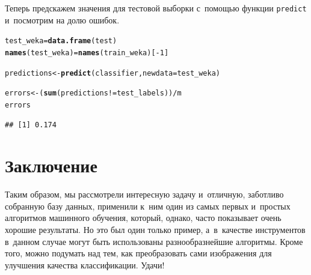 \documentclass[final,pdftex]{../../template/epsilonj}\usepackage[]{graphicx}\usepackage[]{color}
\makeatletter
\newcommand{\hlnum}[1]{\textcolor[rgb]{0.686,0.059,0.569}{#1}}%
\newcommand{\hlopt}[1]{\textcolor[rgb]{0,0,0}{#1}}%
\newcommand{\hlstd}[1]{\textcolor[rgb]{0.345,0.345,0.345}{#1}}%
\newcommand{\hlkwb}[1]{\textcolor[rgb]{0.69,0.353,0.396}{#1}}%
\newcommand{\hlkwc}[1]{\textcolor[rgb]{0.333,0.667,0.333}{#1}}%
\newcommand{\hlkwd}[1]{\textcolor[rgb]{0.737,0.353,0.396}{\textbf{#1}}}%
\newenvironment{kframe}{%
 \def\at@end@of@kframe{}%
 \ifinner\ifhmode%
  \def\at@end@of@kframe{\end{minipage}}%
  \begin{minipage}{\columnwidth}%
 \fi\fi%
 \def\FrameCommand##1{\hskip\@totalleftmargin \hskip-\fboxsep
 \colorbox{shadecolor}{##1}\hskip-\fboxsep
     \hskip-\linewidth \hskip-\@totalleftmargin \hskip\columnwidth}%
 \MakeFramed {\advance\hsize-\width
   \@totalleftmargin\z@ \linewidth\hsize
   \@setminipage}}%
 {\par\unskip\endMakeFramed%
 \at@end@of@kframe}
\newenvironment{knitrout}{}{} %
\makeatother
\begin{document}
Теперь предскажем значения для тестовой выборки с~помощью функции \texttt{predict} и~посмотрим на долю ошибок.

\begin{knitrout}
\color{fgcolor}\begin{kframe}
\begin{alltt}
\hlstd{test_weka} \hlkwb{=} \hlkwd{data.frame}\hlstd{(test)}
\hlkwd{names}\hlstd{(test_weka)} \hlkwb{=} \hlkwd{names}\hlstd{(train_weka)[}\hlopt{-}\hlnum{1}\hlstd{]}

\hlstd{predictions} \hlkwb{<-} \hlkwd{predict}\hlstd{(classifier,} \hlkwc{newdata} \hlstd{= test_weka)}

\hlstd{errors} \hlkwb{<-} \hlstd{(}\hlkwd{sum}\hlstd{(predictions} \hlopt{!=} \hlstd{test_labels))}\hlopt{/}\hlstd{m}
\hlstd{errors}
\end{alltt}
\begin{verbatim}
## [1] 0.174
\end{verbatim}
\end{kframe}
\end{knitrout}

\section{Заключение}

Таким образом, мы рассмотрели интересную задачу и~отличную, заботливо собранную базу данных, применили к~ним один из самых первых и~простых алгоритмов машинного обучения, который, однако, часто показывает очень хорошие результаты. 
Но это был один только пример, а~в~качестве инструментов в~данном случае могут быть использованы разнообразнейшие алгоритмы. 
Кроме того, можно подумать над тем, как преобразовать сами изображения для улучшения качества классификации. Удачи!


\printbibliography
\end{document}

